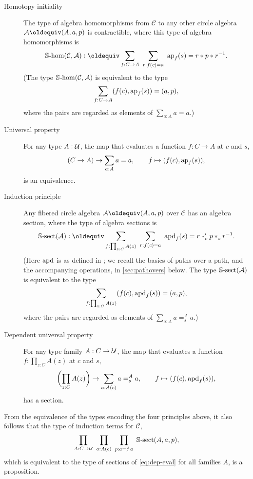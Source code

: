 \documentclass[a4paper,12pt]{amsart}
\begin{document}
\begin{description}
\item[Homotopy initiality]
  The type of algebra homomorphisms
  from $\mathcal C$ to any other circle algebra $\mathcal A\jdeq(A,a,p)$
  is contractible, where this type of algebra homomorphisms is
  \begin{equation}\label{eq:circle-hom}
    \Shom(\mathcal C,\mathcal A) \defeq
    \sum_{f : C \to A}~\sum_{r:f(c)=a}~ \ap{f}(s)=r \ct p \ct r^{-1}.
  \end{equation}
  (The type $\mathop{\mathbb{S}\textup{\kern.5pt-\kern-.5pt}\mathrm{hom}}(\mathcal C,\mathcal A)$ is equivalent to the type
  $$
    \sum_{f : C \to A} (f(c),\mathop{{\mathrm{ap}}_{f}}(s)) = (a,p),
  $$
  where the pairs are regarded as elements of $\sum_{a:A} a=a$.)
\item[Universal property]
  For any type $A:\mathcal{U}$, the map that evaluates a function $f : C \to A$
  at $c$ and $s$,
  \begin{equation}\label{eq:eval}
    (C \to A) \to \sum_{a : A} a=a,
    \qquad
    f \mapsto (f(c), \mathop{{\mathrm{ap}}_{f}}(s)),
  \end{equation}
  is an equivalence.
\item[Induction principle]
  Any fibered circle algebra $\mathcal A\jdeq (A,a,p)$
  over $\mathcal C$ has an algebra section,
  where the type of algebra sections is
  \begin{equation}\label{eq:circle-sect}
    \Ssect(\mathcal A) \defeq
    \sum_{f: \prod_{z:C} A(z)}~
    \sum_{r: f(c) = a}~
    {\apd{f}(s) = r \ctop p \cto r^{-1}}.
  \end{equation}
  (Here $\mathop{{\mathrm{apd}}_{}}$ is as defined in \cite[2.3]{hottbook};
  we recall the basics of paths over a path, and the accompanying
  operations, in \cref{sec:pathovers} below.
  The type $\mathop{\mathbb{S}\textup{\kern.5pt-\kern-.5pt}\mathrm{sect}}(\mathcal A)$ is equivalent to the type
  $$
    \sum_{f: \prod_{z:C} A(z)} (f(c),\mathop{{\mathrm{apd}}_{f}}(s)) = (a,p),
  $$
  where the pairs are regarded as elements of $\sum_{a:A} a=^A_s a$.)
\item[Dependent universal property]
  For any type family $A : C \to \mathcal{U}$, the map that evaluates a function
  $f : \prod_{z:C} A(z)$ at $c$ and $s$,
  \begin{equation}\label{eq:dep-eval}
    \biggl(\prod_{z:C} A(z)\biggr) \to \sum_{a:A(c)} a=^A_s a,
    \qquad
    f \mapsto (f(c), \mathop{{\mathrm{apd}}_{f}}(s)),
  \end{equation}
  has a section.
\end{description}
From the equivalence of the types encoding the four principles above,
it also follows that the type of induction terms
for $\mathcal C$,
\begin{equation}
  \label{eq:circle-induction-gen}
  \prod_{A: C\to\mathcal{U}}~
  \prod_{a: A(c)}~
  \prod_{p: a=^A_s a}~
  \mathop{\mathbb{S}\textup{\kern.5pt-\kern-.5pt}\mathrm{sect}}(A,a,p),
\end{equation}
which is equivalent to the type of sections of \eqref{eq:dep-eval}
for all families $A$, is a proposition.
\end{document}
